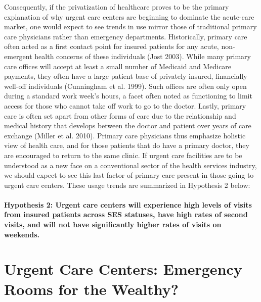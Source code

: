 \documentclass[12pt,twoside]{reedthesis}
\begin{document}
  Consequently, if the privatization of healthcare proves to be the
  primary explanation of why urgent care centers are beginning to dominate
  the acute-care market, one would expect to see trends in use mirror
  those of traditional primary care physicians rather than emergency
  departments. Historically, primary care often acted as a first contact
  point for insured patients for any acute, non-emergent health concerns
  of these individuals (Jost 2003). While many primary care offices will
  accept at least a small number of Medicaid and Medicare payments, they
  often have a large patient base of privately insured, financially
  well-off individuals (Cunningham et al. 1999). Such offices are often
  only open during a standard work week's hours, a facet often noted as
  functioning to limit access for those who cannot take off work to go to
  the doctor. Lastly, primary care is often set apart from other forms of
  care due to the relationship and medical history that develops between
  the doctor and patient over years of care exchange (Miller et al. 2010).
  Primary care physicians thus emphasize holistic view of health care, and
  for those patients that do have a primary doctor, they are encouraged to
  return to the same clinic. If urgent care facilities are to be
  understood as a new face on a conventional sector of the health services
  industry, we should expect to see this last factor of primary care
  present in those going to urgent care centers. These usage trends are
  summarized in Hypothesis 2 below:
  
  \paragraph{Hypothesis 2: Urgent care centers will experience high levels
  of visits from insured patients across SES statuses, have high rates of
  second visits, and will not have significantly higher rates of visits on
  weekends.}\label{hypothesis-2-urgent-care-centers-will-experience-high-levels-of-visits-from-insured-patients-across-ses-statuses-have-high-rates-of-second-visits-and-will-not-have-significantly-higher-rates-of-visits-on-weekends.}
  
  \section{Urgent Care Centers: Emergency Rooms for the
  Wealthy?}\label{urgent-care-centers-emergency-rooms-for-the-wealthy}
  
\end{document}
